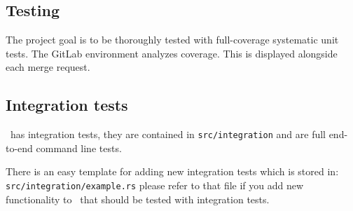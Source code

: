 \subsection{Testing}

The project goal is to be thoroughly tested with full-coverage systematic unit tests.
The GitLab environment analyzes coverage. This is displayed alongside each merge request.

\subsection{Integration tests}

\gourd\ has integration tests, they are contained in \texttt{src/integration} and
are full end-to-end command line tests.

There is an easy template for adding new integration tests which is stored in: \\
\texttt{src/integration/example.rs} please refer to that file if you add
new functionality to \gourd\ that should be tested with integration tests.

